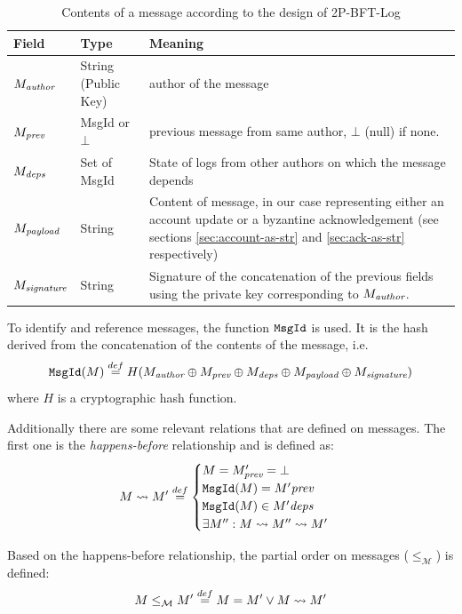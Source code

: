 \documentclass{article}
\begin{document}
\begin{table}
    \begin{tabular}{|l|l|p{5cm}|}
    \hline
    \textbf{Field} & \textbf{Type} & \textbf{Meaning}\\
    \hline
    $M_\emph{author}$ & String (Public Key) & author of the message \\
    $M_\emph{prev}$ & MsgId or $\bot$ & previous message from same author, $\bot$ (null) if none.\\
    $M_\emph{deps}$ & Set of MsgId & State of logs from other authors on which the message depends\\
    $M_\emph{payload}$ & String & Content of message, in our case representing either an account update or a byzantine acknowledgement (see sections \ref{sec:account-as-str} and \ref{sec:ack-as-str} respectively) \\
    $M_\emph{signature}$ & String & Signature of the concatenation of the previous fields using the private key corresponding to $M_\emph{author}$.\\
    \hline
    \end{tabular}
    \caption{Contents of a message according to the design of 2P-BFT-Log}
    \label{tab:2p-bft-log-msg-content}
\end{table}

To identify and reference messages, the function $\texttt{MsgId}$ is used.
It is the hash derived from the concatenation of the contents of the message, i.e.
\[
    \texttt{MsgId}(M) \stackrel{def}{=} H(M_\emph{author} \oplus M_\emph{prev} \oplus M_\emph{deps} \oplus M_\emph{payload} \oplus M_\emph{signature})
\]
where $H$ is a cryptographic hash function.

Additionally there are some relevant relations that are defined on messages.
The first one is the \emph{happens-before} relationship and is defined as:
\begin{equation}
    M \rightsquigarrow M' \stackrel{def}{=} \begin{cases}
        M = M'_\emph{prev} = \bot \\
        \texttt{MsgId}(M) = M'\emph{prev} \\
        \texttt{MsgId}(M) \in M'\emph{deps} \\
        \exists M'' : M \rightsquigarrow M'' \rightsquigarrow M'
    \end{cases}
    \label{eqn:happens-before}
\end{equation}

Based on the happens-before relationship, the partial order on messages ($\le_\mathcal{M}$) is defined:
\[
    M \le_\mathcal{M} M' \stackrel{def}{=} M = M' \lor M \rightsquigarrow M'
\]
\end{document}
